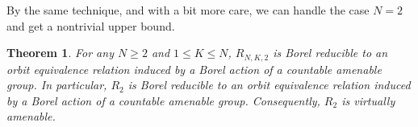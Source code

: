 \documentclass{amsart}
\newtheorem{theorem}{Theorem}[section]
\theoremstyle{definition}
\theoremstyle{problem}
\theoremstyle{remark}
\numberwithin{equation}{section}
\begin{document}

By the same technique, and with a bit more care, we can handle the case $N=2$ and get a nontrivial upper bound.

\begin{theorem} For any $N\geq 2$ and $1\leq K\leq N$, $R_{N, K, 2}$ is Borel reducible to an orbit equivalence relation induced by a Borel action of a countable amenable group. In particular, $R_2$ is Borel reducible to an orbit equivalence relation induced by a Borel action of a countable amenable group. Consequently, $R_2$ is virtually amenable. 
\end{theorem}
\end{document}
